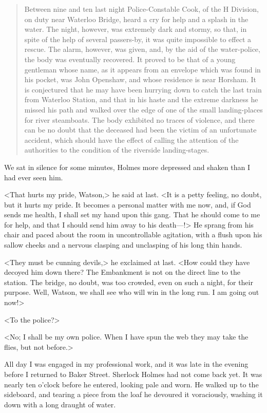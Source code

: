 \begin{quote}
Between nine and ten last night Police-Constable Cook, of the H Division, on duty near Waterloo Bridge, heard a cry for help and a splash in the water. The night, however, was extremely dark and stormy, so that, in spite of the help of several passers-by, it was quite impossible to effect a rescue. The alarm, however, was given, and, by the aid of the water-police, the body was eventually recovered. It proved to be that of a young gentleman whose name, as it appears from an envelope which was found in his pocket, was John Openshaw, and whose residence is near Horsham. It is conjectured that he may have been hurrying down to catch the last train from Waterloo Station, and that in his haste and the extreme darkness he missed his path and walked over the edge of one of the small landing-places for river steamboats. The body exhibited no traces of violence, and there can be no doubt that the deceased had been the victim of an unfortunate accident, which should have the effect of calling the attention of the authorities to the condition of the riverside landing-stages.
\end{quote}

We sat in silence for some minutes, Holmes more depressed and shaken than I had ever seen him.

<That hurts my pride, Watson,> he said at last. <It is a petty feeling, no doubt, but it hurts my pride. It becomes a personal matter with me now, and, if God sends me health, I shall set my hand upon this gang. That he should come to me for help, and that I should send him away to his death—!> He sprang from his chair and paced about the room in uncontrollable agitation, with a flush upon his sallow cheeks and a nervous clasping and unclasping of his long thin hands.

<They must be cunning devils,> he exclaimed at last. <How could they have decoyed him down there? The Embankment is not on the direct line to the station. The bridge, no doubt, was too crowded, even on such a night, for their purpose. Well, Watson, we shall see who will win in the long run. I am going out now!>

<To the police?>

<No; I shall be my own police. When I have spun the web they may take the flies, but not before.>

All day I was engaged in my professional work, and it was late in the evening before I returned to Baker Street. Sherlock Holmes had not come back yet. It was nearly ten o'clock before he entered, looking pale and worn. He walked up to the sideboard, and tearing a piece from the loaf he devoured it voraciously, washing it down with a long draught of water.

